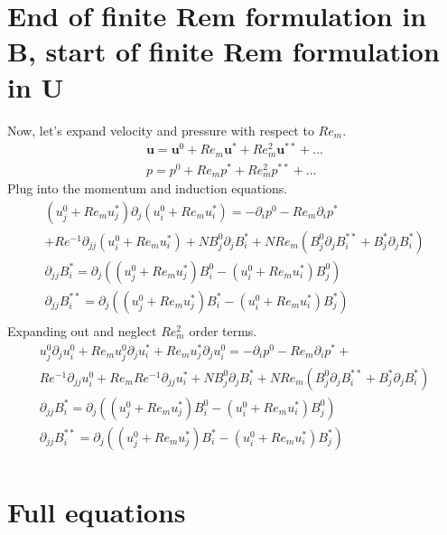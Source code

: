 \documentclass[11pt]{article}
\newcommand{\U}{\mathbf{u}}
\newcommand{\PD}{\partial}
\begin{document}
\section{End of finite Rem formulation in B, start of finite Rem formulation in U}
Now, let's expand velocity and pressure with respect to $Re_m$.
\begin{equation}\begin{aligned}
	\U = \U^0 + Re_m \U^* + Re_m^2 \U^{**} + \hdots \\
	p = p^0 + Re_m p^* + Re_m^2 p^{**} + \hdots
\end{aligned} \end{equation}
Plug into the momentum and induction equations.
\begin{equation}\begin{aligned}
(u_j^0+Re_m u_j^*)\PD_j (u_i^0+Re_m u_i^*) =-\PD_i p^0-Re_m\PD_i p^* \\ + Re^{-1} \PD_{jj} (u_i^0+Re_m u_i^*) + N B_j^0 \PD_j B_i^* + N Re_m ( B_j^0 \PD_j B_i^{**} + B_j^* \PD_j B_i^* ) \\
\PD_{jj} B_i^{*}  = \PD_j ((u_j^0+Re_m u_j^*) B_i^{0} - (u_i^0+Re_m u_i^*) B_j^{0}) \\
\PD_{jj} B_i^{**} = \PD_j ((u_j^0+Re_m u_j^*) B_i^{*} - (u_i^0+Re_m u_i^*) B_j^{*}) \\
\end{aligned}\end{equation}
Expanding out and neglect $Re_m^2$ order terms.
\begin{equation}\boxed{\begin{aligned}
u_j^0 \PD_j u_i^0 + Re_m u_j^0 \PD_j u_i^* + Re_m u_j^* \PD_j u_i^0 = -\PD_i p^0 - Re_m\PD_i p^*+  \\
Re^{-1} \PD_{jj} u_i^0 + Re_m Re^{-1} \PD_{jj} u_i^*
+ N B_j^0 \PD_j B_i^* + N Re_m ( B_j^0 \PD_j B_i^{**} + B_j^* \PD_j B_i^* )
\\
\PD_{jj} B_i^{*}  = \PD_j ((u_j^0+Re_m u_j^*) B_i^{0} - (u_i^0+Re_m u_i^*) B_j^{0}) \\
\PD_{jj} B_i^{**} = \PD_j ((u_j^0+Re_m u_j^*) B_i^{*} - (u_i^0+Re_m u_i^*) B_j^{*}) \\
\end{aligned}}\end{equation}

\section{Full equations}
\end{document}
